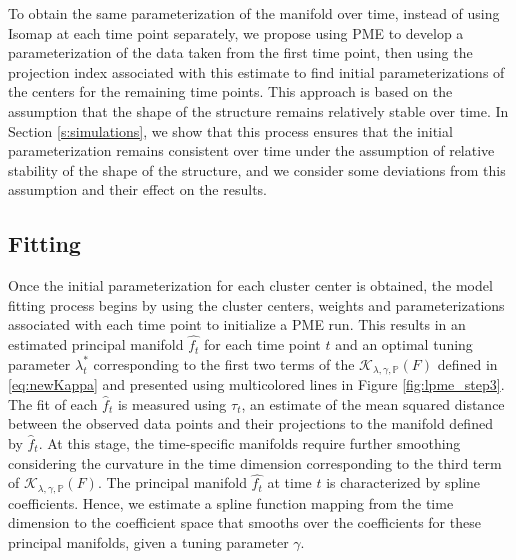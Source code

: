 \documentclass[11pt,reqno]{article}
\theoremstyle{definition}
\begin{document}
To obtain the same parameterization of the manifold over time, instead of using Isomap at each time point separately, we propose using PME to develop a parameterization of the data taken from the first time point, then using the projection index associated with this estimate to find initial parameterizations of the centers for the remaining time points. This approach is based on the assumption that the shape of the structure remains relatively stable over time. In Section \ref{s:simulations}, we show that this process ensures that the initial parameterization remains consistent over time under the assumption of relative stability of the shape of the structure, and we consider some deviations from this assumption and their effect on the results.

\subsection*{Fitting}

Once the initial parameterization for each cluster center is obtained, the model fitting process begins by using the cluster centers, weights and parameterizations associated with each time point to initialize a PME run. This results in an estimated principal manifold $\widehat{f_t}$ for each time point $t$ and an optimal tuning parameter $\lambda_t^*$ corresponding to the first two terms of the $\mathcal{K}_{\lambda, \gamma, \mathbb{P}}(F)$ defined in \eqref{eq:newKappa} and presented using multicolored lines in Figure \ref{fig:lpme_step3}. The fit of each $\hat{f}_t$ is measured using $\tau_t$, an estimate of the mean squared distance between the observed data points and their projections to the manifold defined by $\hat{f}_t$. At this stage, the time-specific manifolds require further smoothing considering the curvature in the time dimension corresponding to the third term of $\mathcal{K}_{\lambda, \gamma, \mathbb{P}}(F)$. The principal manifold $\widehat{f_t}$ at time $t$ is characterized by spline coefficients. Hence, we estimate a spline function mapping from the time dimension to the coefficient space that smooths over the coefficients for these principal manifolds, given a tuning parameter $\gamma$.
\end{document}
